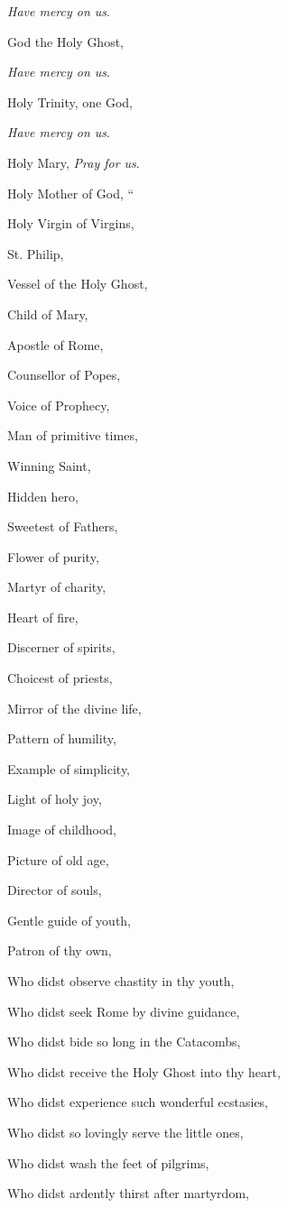 \emph{Have mercy on us}.

God the Holy Ghost,

\emph{Have mercy on us}.

Holy Trinity, one God,

\emph{Have mercy on us}.

Holy Mary, \emph{Pray
for us}.

Holy Mother of God,
``

Holy Virgin of Virgins,

St. Philip,

Vessel of the Holy Ghost,

Child of Mary,

Apostle of Rome, 

Counsellor of Popes,

Voice of Prophecy,

Man of primitive times,

Winning Saint,

Hidden hero,

Sweetest of Fathers,

Flower of purity,

Martyr of charity,

Heart of fire,

Discerner of spirits,

Choicest of priests,

Mirror of the divine life,

Pattern of humility,

Example of simplicity,

Light of holy joy,

Image of childhood,

Picture of old age,

Director of souls,

Gentle guide of youth,

Patron of thy own,

Who didst observe chastity in thy youth,

Who didst seek Rome by divine guidance,

Who didst bide so long in the Catacombs,

Who didst receive the Holy Ghost into thy heart,

Who didst experience such wonderful ecstasies,

Who didst so lovingly serve the little ones,

Who didst wash the feet of pilgrims,

Who didst ardently thirst after martyrdom,

